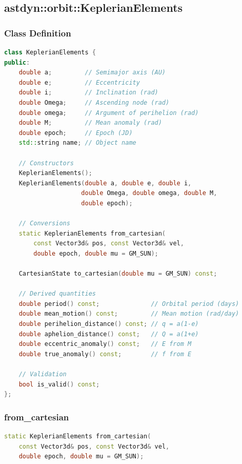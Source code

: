 \subsection{astdyn::orbit::KeplerianElements}

\subsubsection{Class Definition}

\begin{lstlisting}[language=C++]
class KeplerianElements {
public:
    double a;         // Semimajor axis (AU)
    double e;         // Eccentricity
    double i;         // Inclination (rad)
    double Omega;     // Ascending node (rad)
    double omega;     // Argument of perihelion (rad)
    double M;         // Mean anomaly (rad)
    double epoch;     // Epoch (JD)
    std::string name; // Object name
    
    // Constructors
    KeplerianElements();
    KeplerianElements(double a, double e, double i, 
                     double Omega, double omega, double M, 
                     double epoch);
    
    // Conversions
    static KeplerianElements from_cartesian(
        const Vector3d& pos, const Vector3d& vel, 
        double epoch, double mu = GM_SUN);
    
    CartesianState to_cartesian(double mu = GM_SUN) const;
    
    // Derived quantities
    double period() const;              // Orbital period (days)
    double mean_motion() const;         // Mean motion (rad/day)
    double perihelion_distance() const; // q = a(1-e)
    double aphelion_distance() const;   // Q = a(1+e)
    double eccentric_anomaly() const;   // E from M
    double true_anomaly() const;        // f from E
    
    // Validation
    bool is_valid() const;
};
\end{lstlisting}

\subsubsection{from\_cartesian}

\begin{lstlisting}[language=C++]
static KeplerianElements from_cartesian(
    const Vector3d& pos, const Vector3d& vel, 
    double epoch, double mu = GM_SUN);
\end{lstlisting}

